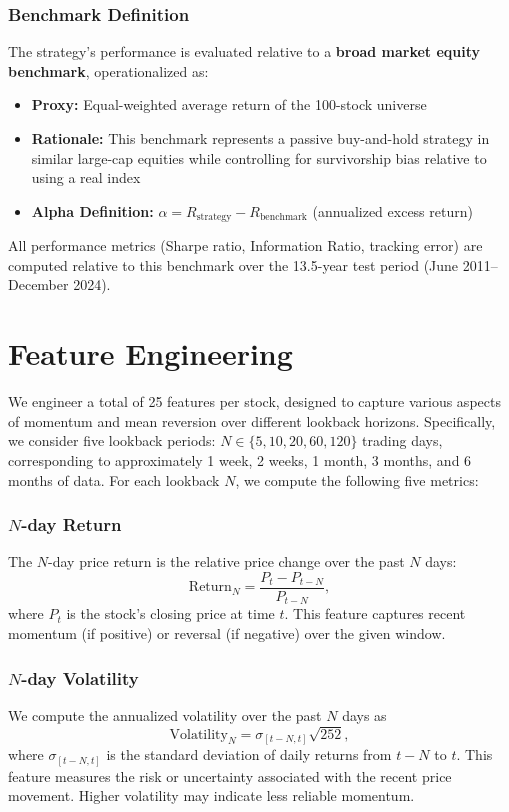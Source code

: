 \documentclass[conference]{IEEEtran}
\begin{document}
\subsubsection{Benchmark Definition}
The strategy's performance is evaluated relative to a \textbf{broad market equity benchmark}, operationalized as:
\begin{itemize}
    \item \textbf{Proxy:} Equal-weighted average return of the 100-stock universe
    \item \textbf{Rationale:} This benchmark represents a passive buy-and-hold strategy in similar large-cap equities while controlling for survivorship bias relative to using a real index
    \item \textbf{Alpha Definition:} $\alpha = R_\text{strategy} - R_\text{benchmark}$ (annualized excess return)
\end{itemize}

All performance metrics (Sharpe ratio, Information Ratio, tracking error) are computed relative to this benchmark over the 13.5-year test period (June 2011--December 2024).

\section{Feature Engineering}\label{sec:features}
We engineer a total of 25 features per stock, designed to capture various aspects of momentum and mean reversion over different lookback horizons. Specifically, we consider five lookback periods: $N \in \{5, 10, 20, 60, 120\}$ trading days, corresponding to approximately 1 week, 2 weeks, 1 month, 3 months, and 6 months of data. For each lookback $N$, we compute the following five metrics:

\subsubsection{$N$-day Return}
The $N$-day price return is the relative price change over the past $N$ days:
\begin{equation}
\mathrm{Return}_N = \frac{P_t - P_{t-N}}{P_{t-N}},
\end{equation}
where $P_t$ is the stock's closing price at time $t$. This feature captures recent momentum (if positive) or reversal (if negative) over the given window.

\subsubsection{$N$-day Volatility}
We compute the annualized volatility over the past $N$ days as
\begin{equation}
\mathrm{Volatility}_N = \sigma_{[t-N, t]} \sqrt{252},
\end{equation}
where $\sigma_{[t-N,t]}$ is the standard deviation of daily returns from $t-N$ to $t$. This feature measures the risk or uncertainty associated with the recent price movement. Higher volatility may indicate less reliable momentum.
\end{document}
